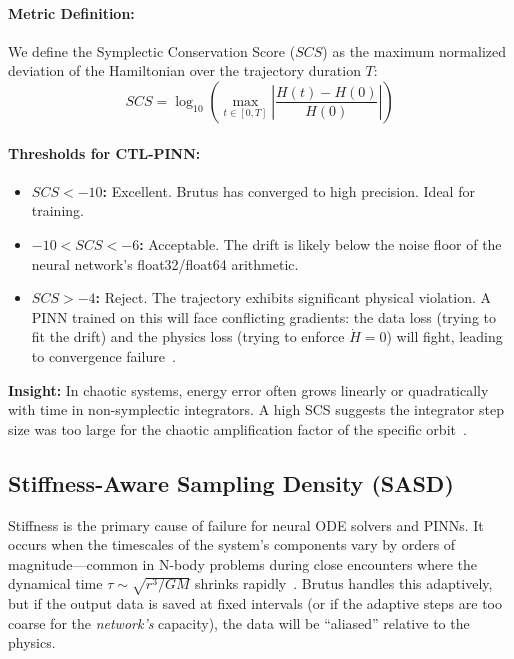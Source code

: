 \documentclass[11pt, a4paper]{article}
\begin{document}
\paragraph{Metric Definition:}
We define the Symplectic Conservation Score ($SCS$) as the maximum normalized deviation of the Hamiltonian over the trajectory duration $T$:
\begin{equation}
    SCS = \log_{10} \left( \max_{t \in [0, T]} \left| \frac{H(t) - H(0)}{H(0)} \right| \right)
\end{equation}

\paragraph{Thresholds for CTL-PINN:}
\begin{itemize}
    \item \textbf{$SCS < -10$:} Excellent. Brutus has converged to high precision. Ideal for training.
    \item \textbf{$-10 < SCS < -6$:} Acceptable. The drift is likely below the noise floor of the neural network's float32/float64 arithmetic.
    \item \textbf{$SCS > -4$:} Reject. The trajectory exhibits significant physical violation. A PINN trained on this will face conflicting gradients: the data loss (trying to fit the drift) and the physics loss (trying to enforce $\dot{H}=0$) will fight, leading to convergence failure~\cite{ref21}.
\end{itemize}

\textbf{Insight:} In chaotic systems, energy error often grows linearly or quadratically with time in non-symplectic integrators. A high SCS suggests the integrator step size was too large for the chaotic amplification factor of the specific orbit~\cite{ref1}.

\subsection{Stiffness-Aware Sampling Density (SASD)}

Stiffness is the primary cause of failure for neural ODE solvers and PINNs. It occurs when the timescales of the system's components vary by orders of magnitude—common in N-body problems during close encounters where the dynamical time $\tau \sim \sqrt{r^3/GM}$ shrinks rapidly~\cite{ref23}. Brutus handles this adaptively, but if the output data is saved at fixed intervals (or if the adaptive steps are too coarse for the \textit{network's} capacity), the data will be ``aliased'' relative to the physics.
\end{document}
